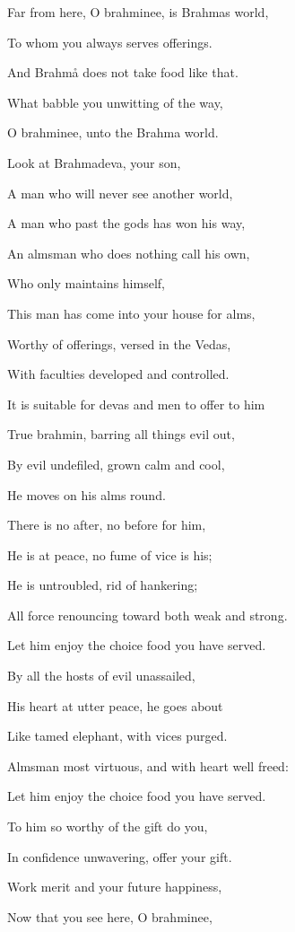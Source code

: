 \documentclass[12pt,twoside]{article}
\begin{document}
\bigskip

Far from here, O brahminee, is Brahma{\textquotesingle}s world, 

To whom you always serves offerings. 

And Brahm{\aa} does not take food like that. 

What babble you unwitting of the way,

O brahminee, unto the Brahma world.

Look at Brahmadeva, your son, 

A man who will never see another world, 

A man who past the gods has won his way, 

An almsman who does nothing call his own, 

Who only maintains himself, 

This man has come into your house for alms, 

Worthy of offerings, versed in the Vedas, 

With faculties developed and controlled. 

It is suitable for devas and men to offer to him

True brahmin, barring all things evil out, 

By evil undefiled, grown calm and cool, 

He moves on his alms round. 

There is no after, no before for him, 

He is at peace, no fume of vice is his;

He is untroubled, rid of hankering;

All force renouncing toward both weak and strong. 

Let him enjoy the choice food you have served. 

By all the hosts of evil unassailed, 

His heart at utter peace, he goes about

Like tamed elephant, with vices purged. 

Almsman most virtuous, and with heart well freed:

Let him enjoy the choice food you have served. 

To him so worthy of the gift do you, 

In confidence unwavering, offer your gift. 

Work merit and your future happiness, 

Now that you see here, O brahminee, 
\end{document}
